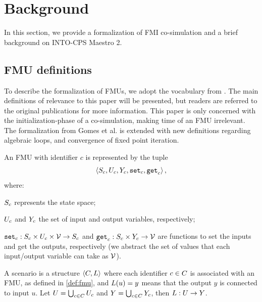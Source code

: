 \section{Background}\label{sc:background}
In this section, we provide a formalization of FMI co-simulation and a brief background on INTO-CPS Maestro 2.

\subsection{FMU definitions}
To describe the formalization of FMUs, we adopt the vocabulary from \cite{gomes_lucio_vangheluwe_2019, Gomes2018}. The main definitions of relevance to this paper will be presented, but readers are referred to the original publications for more information. This paper is only concerned with the initialization-phase of a co-simulation, making time of an FMU irrelevant. The formalization from Gomes et al. is extended with new definitions regarding algebraic loops, and convergence of fixed point iteration.
\begin{definition}[FMU]\label{def:fmu}
  An FMU with identifier $c$ is represented by the tuple   
  $$ \left\langle S_{c}, U_{c}, Y_{c}, \mathtt{set}_{c}, \mathtt{get}_{c} \right\rangle ,$$
  where:
  \begin{inparadesc}
    \item $S_{c}$ represents the state space;
    \item $U_{c}$ and $Y_{c}$ the set of input and output variables, respectively;
    \item $\mathtt{set}_{c} : S_{c} \times U_{c} \times \mathcal{V} \to S_{c}$ and $\mathtt{get}_{c}: S_{c} \times Y_{c} \to \mathcal{V}$ are functions to set the inputs and get the outputs, respectively (we abstract the set of values that each input/output variable can take as $\mathcal{V}$).
  \end{inparadesc}
\end{definition}

\begin{definition}[Scenario]\label{def:cosim_scenario}
  A scenario is a structure $ \left\langle C, L \right\rangle $ where each identifier $c \in C$ is associated with an FMU, as defined in \cref{def:fmu}, and $L(u)=y$ means that the output $y$ is connected to input $u$.
  Let $U = \bigcup_{c \in C} U_{c}$ and $Y = \bigcup_{c \in C} Y_{c}$, then $L : U \to Y$.
\end{definition}

